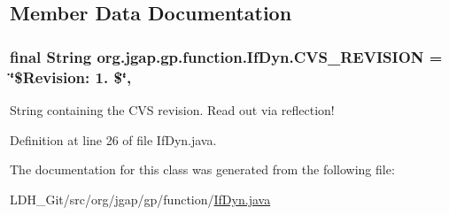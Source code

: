 \subsection{Member Data Documentation}
\hypertarget{classorg_1_1jgap_1_1gp_1_1function_1_1_if_dyn_a777f4f4f205eef04f5b5028f0cf433ab}{
\subsubsection[{C\-V\-S\-\_\-\-R\-E\-V\-I\-S\-I\-O\-N}]{\setlength{\rightskip}{0pt plus 5cm}final String org.\-jgap.\-gp.\-function.\-If\-Dyn.\-C\-V\-S\-\_\-\-R\-E\-V\-I\-S\-I\-O\-N = \char`\"{}\$Revision\-: 1. \$\char`\"{}\hspace{0.3cm}{\ttfamily [static]}, {\ttfamily [private]}}}\label{classorg_1_1jgap_1_1gp_1_1function_1_1_if_dyn_a777f4f4f205eef04f5b5028f0cf433ab}
String containing the C\-V\-S revision. Read out via reflection! 

Definition at line 26 of file If\-Dyn.\-java.



The documentation for this class was generated from the following file\-:\begin{DoxyCompactItemize}
\item 
L\-D\-H\-\_\-\-Git/src/org/jgap/gp/function/\hyperlink{_if_dyn_8java}{If\-Dyn.\-java}\end{DoxyCompactItemize}
